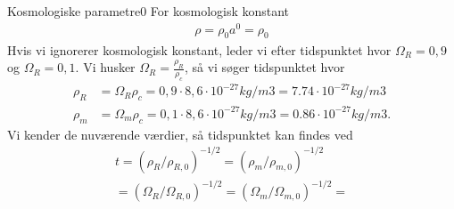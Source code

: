 \begin{opgave}{Kosmologiske parametre}{0}
	 For kosmologisk konstant
	 	\begin{align}
		 	\rho = \rho_0 a^0 = \rho_0 %
	 	\end{align}
	 \opg Hvis vi ignorerer kosmologisk konstant, leder vi efter tidspunktet hvor $\Omega_R = 0,9$ og $\Omega_R = 0,1$. Vi husker $\Omega_R=\frac{\rho_R}{\rho_c}$, så vi søger tidspunktet hvor
	 \begin{align}
	 	\rho_R &= \Omega_R \rho_c = 0,9 \cdot 8,6 \cdot 10^{-27}kg/m3 = 7.74 \cdot  10^{-27}kg/m3\\
	 	\rho_m &= \Omega_m \rho_c = 0,1 \cdot 8,6 \cdot 10^{-27}kg/m3 = 0.86 \cdot  10^{-27}kg/m3.
	 \end{align}
	 Vi kender de nuværende værdier, så tidspunktet kan findes ved
	 \begin{align}
	 	t=(\rho_R/\rho_{R,0})^{-1/2} = (\rho_m/\rho_{m,0})^{-1/2}\\
	 	=(\Omega_R/\Omega_{R,0})^{-1/2} = (\Omega_m/\Omega_{m,0})^{-1/2}
	 	=
	 \end{align}
	 \fi
\end{opgave}
